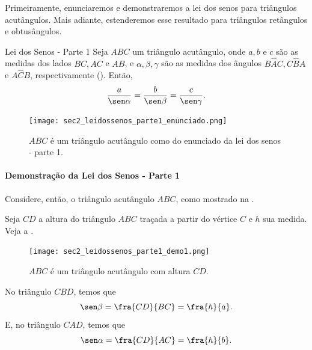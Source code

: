 Primeiramente, enunciaremos e demonstraremos a lei dos senos para triângulos acutângulos. Mais adiante, estenderemos esse resultado para triângulos retângulos e obtusângulos.

\begin{observationtitle}{Lei dos Senos - Parte 1}
\label{sec2_leidossenos}
Seja $ABC$ um triângulo acutângulo, onde $a, b$ e $c$ são as medidas dos lados $BC, AC$ e $AB$, e $\alpha, \beta, \gamma$ são as medidas dos ângulos $B\hat{A}C,C\hat{B}A$ e $A\hat{C}B$, respectivamente (). Então,
\begin{equation}\label{sec2_leidossenos_eq_parte1}
    \frac{a}{\sen\alpha} = \frac{b}{\sen\beta} = \frac{c}{\sen\gamma}.
\end{equation}
\begin{figure}[H]
    \centering
    \texttt{[image: sec2\_leidossenos\_parte1\_enunciado.png]}
    \caption{$ABC$ é um triângulo acutângulo como do enunciado da lei dos senos - parte 1.}
    \label{sec2_leidossenos_parte1_demo_enunciado_fig}
\end{figure}
\end{observationtitle}

\paragraph{Demonstração da Lei dos Senos - Parte 1}

Considere, então, o triângulo acutângulo $ABC$, como mostrado na .

Seja $CD$ a altura do triângulo $ABC$ traçada a partir do vértice $C$ e $h$ sua medida. Veja a .
\begin{figure}[H]
    \centering
    \texttt{[image: sec2\_leidossenos\_parte1\_demo1.png]}
    \caption{$ABC$ é um triângulo acutângulo com altura $CD$.}
    \label{sec2_leidossenos_parte1_demo1_fig}
\end{figure}

No triângulo $CBD$, temos que 
\begin{equation}
\sen\beta=\fra{CD}{BC}=\fra{h}{a}.    \label{sec2_leidossenos_demo_parte1_eq1}
\end{equation}
E, no triângulo $CAD$, temos que
\begin{equation}
\sen\alpha=\fra{CD}{AC}=\fra{h}{b}.    \label{sec2_leidossenos_demo_parte1_eq2}
\end{equation}

